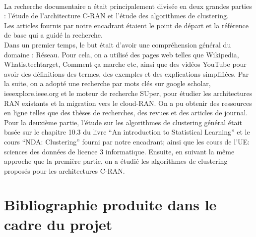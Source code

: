 \documentclass{article}
\begin{document}
\paragraph{}
La recherche documentaire a était principalement divisée en deux grandes parties : 
l'étude de l'architecture C-RAN et l'étude des algorithmes de clustering.\\
Les articles fournis par notre encadrant étaient le point de départ et la référence 
de base qui a guidé la recherche. \\
Dans un premier temps, le but était d’avoir une compréhension général du domaine : Réseau. 
Pour cela, on a utilisé des pages web telles que Wikipedia, Whatis.techtarget, Comment ça marche 
etc, ainsi que des vidéos YouTube pour avoir des définitions des termes, des exemples et des 
explications simplifiées. Par la suite, on a adopté une recherche par mots clés sur google 
scholar, ieeexplore.ieee.org et le moteur de recherche SUper, pour étudier les architectures 
RAN existants et la migration vers le cloud-RAN. On a pu obtenir des ressources en ligne telles 
que des thèses de recherches, des revues et des articles de journal.\\
Pour la deuxième partie, l’étude sur les algorithmes de clustering général était basée sur le chapitre 10.3 du livre “An introduction to Statistical Learning” et le cours “NDA: Clustering” fourni par notre encadrant; ainsi que les cours de l'UE: sciences des données de licence 3 informatique. Ensuite, en suivant la même approche que la première partie, on a étudié les algorithmes de clustering proposés pour les architectures C-RAN.
\section{Bibliographie produite dans le cadre du projet}
\end{document}
